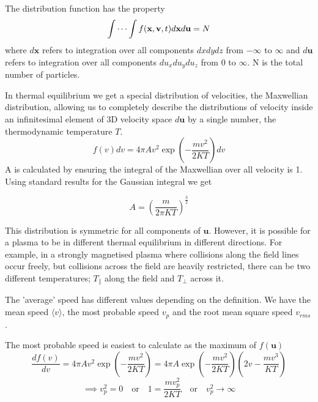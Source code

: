 The distribution function has the property
\begin{equation}\label{distribution_total_integral}
	\idotsint f(\textbf{x}, \textbf{v}, t) d\textbf{x}d\textbf{u} = N
\end{equation}
where $d\textbf{x}$ refers to integration over all components $dxdydz$ from $-\infty$ to $\infty$ and $d\textbf{u}$ refers to integration over all components $du_xdu_ydu_z$ from $0$ to $\infty$. N is the total number of particles.

In thermal equilibrium we get a special distribution of velocities, the Maxwellian distribution, allowing us to completely describe the distributions of velocity inside an infinitesimal element of 3D velocity space $d\textbf{u}$ by a single number, the thermodynamic temperature $T$.
\begin{equation}
	f(v)dv=4\pi A v^2 \exp\left(-\frac{mv^2}{2KT}\right)dv
\end{equation}
A is calculated by ensuring the integral of the Maxwellian over all velocity is 1. Using standard results for the Gaussian integral we get

\begin{equation}
	A=\left(\frac{m}{2\pi KT}\right)^{\frac{3}{2}}
\end{equation}

This distribution is symmetric for all components of $\textbf{u}$. However, it is possible for a plasma to be in different thermal equilibrium in different directions. For example, in a strongly magnetised plasma where collisions along the field lines occur freely, but collisions across the field are heavily restricted, there can be two different temperatures; $T_{\parallel}$ along the field and $T_{\perp}$ across it.

The 'average' speed has different values depending on the definition. We have the mean speed $\langle v \rangle$, the most probable speed $v_p$ and the root mean square speed $v_{rms}$.

The most probable speed is easiest to calculate as the maximum of $f(\textbf{u})$
\begin{equation}
	\frac{df(v)}{dv}=4\pi A v^2 \exp\left(-\frac{mv^2}{2KT}\right) = 4\pi A\exp\left(-\frac{mv^2}{2KT}\right)\left(2v-\frac{mv^3}{KT}\right)
\end{equation}
\begin{equation}
	\implies v_p^2 = 0 \quad \text{or} \quad 1 = \frac{mv_p^2}{2KT} \quad \text{or} \quad v_p^2 \rightarrow \infty
\end{equation}

